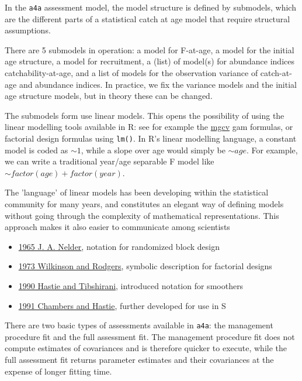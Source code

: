 \documentclass[a4paper,english,10pt]{article}\usepackage[]{graphicx}\usepackage[]{color}
\newcommand{\initiative}[1]{{\texttt{#1}}}
\newcommand{\code}[1]{{\texttt{#1}}}
\begin{document}
In the \initiative{a4a} assessment model, the model structure is defined by submodels, which are the different parts of a statistical catch at age model that require structural assumptions.

There are 5 submodels in operation: a model for F-at-age, a model for the initial age structure, a model for recruitment, a (list) of model(s) for abundance indices catchability-at-age, and a list of models for the observation variance of catch-at-age and abundance indices. In practice, we fix the variance models and the initial age structure models, but in theory these can be changed.

The submodels form use linear models. This opens the possibility of using the linear modelling tools available in R: see for example the \href{http://cran.r-project.org/web/packages/mgcv/index.html}{mgcv} gam formulas, or factorial design formulas using \code{lm()}. In R's linear modelling language, a constant model is coded as $\sim 1$, while a slope over age would simply be $\sim age$. For example, we can write a traditional year/age separable F model like $\sim factor(age) + factor(year)$.

The 'language' of linear models has been developing within the statistical community for many years, and constitutes an elegant way of defining models without going through the complexity of mathematical representations. This approach makes it also easier to communicate among scientists 
  \begin{itemize}
  \item \href{http://rspa.royalsocietypublishing.org/content/283/1393/147.short}{1965 J. A. Nelder}, notation for randomized block design
  \item \href{http://www.jstor.org/stable/info/2346786}{1973 Wilkinson and Rodgers}, symbolic description for factorial designs
  \item \href{http://books.google.com/books?isbn=0412343908}{1990 Hastie and Tibshirani}, introduced notation for smoothers
  \item \href{http://books.google.com/books?isbn=041283040X}{1991 Chambers and Hastie}, further developed for use in S
  \end{itemize}

There are two basic types of assessments available in \initiative{a4a}: the management procedure fit and the full assessment fit. The management procedure fit does not compute estimates of covariances and is therefore quicker to execute, while the full assessment fit returns parameter estimates and their covariances at the expense of longer fitting time.
\end{document}
